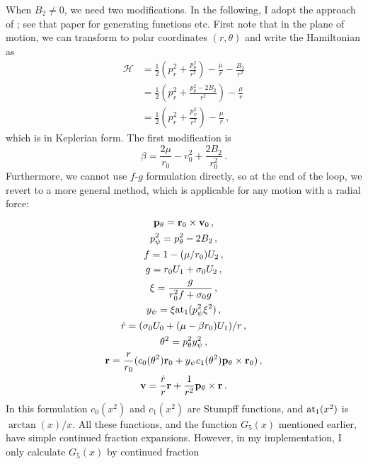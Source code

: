 \documentclass{article}
\begin{document}
When $B_2 \neq 0 $, we need two modifications.
In the following, I adopt the approach of \citet{1999CeMDA..74..275M};
see that paper for generating functions etc.
First note that in the plane of motion, we can transform to polar
coordinates $(r,\theta)$ and write the Hamiltonian as
\begin{equation}
\begin{split}
{\mathcal H} &= \frac{1}{2}\left(p_r^2 + \frac{p_\theta^2}{r^2}\right)
	       - \frac{\mu}{r} -\frac{B_2}{r^2} \\
& = \frac{1}{2}\left(p_r^2 + \frac{p_\theta^2 - 2B_2}{r^2}\right)
	       - \frac{\mu}{r} \\
& = \frac{1}{2}\left(p_r^2 + \frac{p_\psi^2}{r^2}\right)
	       - \frac{\mu}{r}\,,
\end{split}
\end{equation}
which is in Keplerian form. The first modification is
\begin{equation}
\beta = \frac{2\mu}{r_0} - v_0^2 + \frac{2 B_2}{r_0^2} \,.
\end{equation}
Furthermore, we cannot use $f$-$g$ formulation directly, so at the end of the loop,
we revert to a more general method, which is applicable for any motion with a radial force:
\begin{gather}
\mathbf{p}_\theta = \mathbf{r}_0 \times \mathbf{v}_0 \,,\\
p_\psi^2 = p_\theta^2 - 2 B_2 \,,\\
f = 1 - (\mu/ r_0) U_2 \,,\\
g = r_0 U_1 + \sigma_0 U_2   \,,\\
\xi = \frac{g}{r_0^2 f + \sigma_0 g}\,,\\
y_\psi = \xi  {\rm at}_1(p_\psi^2 \xi^2)\,,\\
\dot{r} = (\sigma_0 U_0 + (\mu - \beta r_0) U_1)/r \,,\\
\theta^2 = p_\theta^2 y_\psi^2 \,,\\
\mathbf{r} = \frac{r}{r_0} (c_0(\theta^2) \mathbf{r}_0 
		   + y_\psi c_1(\theta^2) \mathbf{p}_\theta \times \mathbf{r}_0)\,,\\
\mathbf{v} = \frac{\dot{r}}{r} \mathbf{r} + \frac{1}{r^2}\mathbf{p}_\theta\times\mathbf{r}\,.
\end{gather}
In this formulation $c_0(x^2)$ and $c_1(x^2)$ are Stumpff functions,
and ${\rm at}_1(x^2)$ is $\arctan(x)/x$.  All these functions, and the function
$G_5(x)$ mentioned earlier, have simple continued fraction expansions.
However, in my implementation, I only calculate $G_5(x)$ by continued fraction
\end{document}
